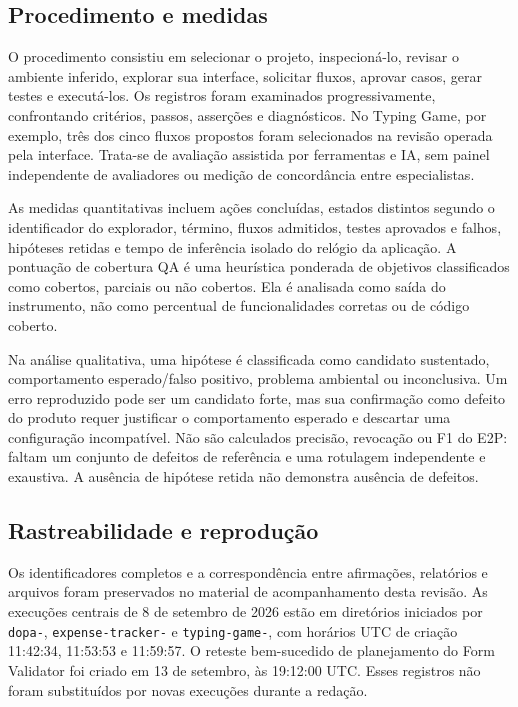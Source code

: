 \documentclass[12pt]{article}
\begin{document}
\subsection{Procedimento e medidas}
O procedimento consistiu em selecionar o projeto, inspecioná-lo, revisar o ambiente inferido, explorar sua interface, solicitar fluxos, aprovar casos, gerar testes e executá-los. Os registros foram examinados progressivamente, confrontando critérios, passos, asserções e diagnósticos. No Typing Game, por exemplo, três dos cinco fluxos propostos foram selecionados na revisão operada pela interface. Trata-se de avaliação assistida por ferramentas e IA, sem painel independente de avaliadores ou medição de concordância entre especialistas.

As medidas quantitativas incluem ações concluídas, estados distintos segundo o identificador do explorador, término, fluxos admitidos, testes aprovados e falhos, hipóteses retidas e tempo de inferência isolado do relógio da aplicação. A pontuação de cobertura QA é uma heurística ponderada de objetivos classificados como cobertos, parciais ou não cobertos. Ela é analisada como saída do instrumento, não como percentual de funcionalidades corretas ou de código coberto.

Na análise qualitativa, uma hipótese é classificada como candidato sustentado, comportamento esperado/falso positivo, problema ambiental ou inconclusiva. Um erro reproduzido pode ser um candidato forte, mas sua confirmação como defeito do produto requer justificar o comportamento esperado e descartar uma configuração incompatível. Não são calculados precisão, revocação ou F1 do E2P: faltam um conjunto de defeitos de referência e uma rotulagem independente e exaustiva. A ausência de hipótese retida não demonstra ausência de defeitos.

\subsection{Rastreabilidade e reprodução}
Os identificadores completos e a correspondência entre afirmações, relatórios e arquivos foram preservados no material de acompanhamento desta revisão. As execuções centrais de 8 de setembro de 2026 estão em diretórios iniciados por \texttt{dopa-}, \texttt{expense-tracker-} e \texttt{typing-game-}, com horários UTC de criação 11:42:34, 11:53:53 e 11:59:57. O reteste bem-sucedido de planejamento do Form Validator foi criado em 13 de setembro, às 19:12:00 UTC. Esses registros não foram substituídos por novas execuções durante a redação.
\end{document}
